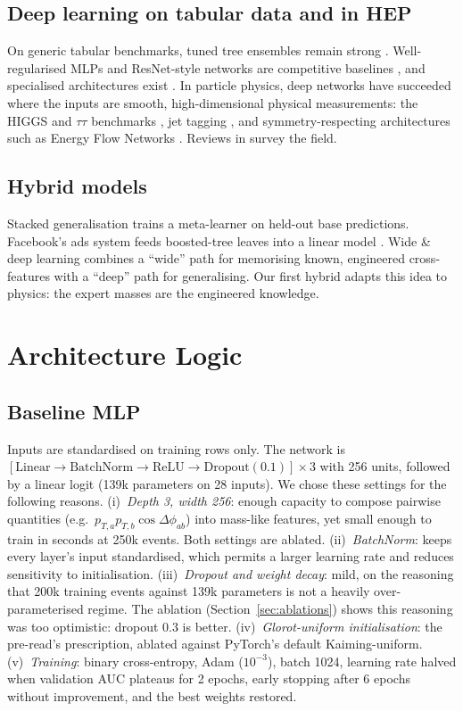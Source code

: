 \documentclass[conference]{IEEEtran}
\begin{document}
\subsection{Deep learning on tabular data and in HEP}
On generic tabular benchmarks, tuned tree ensembles remain strong
\cite{grinsztajn2022tree,shwartzziv2022tabular}. Well-regularised MLPs and ResNet-style networks are
competitive baselines \cite{gorishniy2021revisiting}, and specialised architectures exist
\cite{arik2021tabnet,popov2020neural}. In particle physics, deep networks have succeeded where the
inputs are smooth, high-dimensional physical measurements: the HIGGS and $\tau\tau$ benchmarks
\cite{baldi2014searching,baldi2015tautau}, jet tagging \cite{kasieczka2019toptagging}, and
symmetry-respecting architectures such as Energy Flow Networks \cite{komiske2019energyflow}. Reviews
in \cite{guest2018deep,radovic2018machine} survey the field.

\subsection{Hybrid models}
Stacked generalisation \cite{wolpert1992stacked} trains a meta-learner on held-out base predictions.
Facebook's ads system feeds boosted-tree leaves into a linear model \cite{he2014practical}. Wide \&
deep learning \cite{cheng2016wide} combines a ``wide'' path for memorising known, engineered
cross-features with a ``deep'' path for generalising. Our first hybrid adapts this idea to physics:
the expert masses are the engineered knowledge.

\section{Architecture Logic}\label{sec:arch}
\subsection{Baseline MLP}
Inputs are standardised on training rows only. The network is
$[\text{Linear}\to\text{BatchNorm}\to\text{ReLU}\to\text{Dropout}(0.1)]\times3$ with 256 units,
followed by a linear logit (139k parameters on 28 inputs). We chose these settings for the following
reasons.
(i)~\emph{Depth 3, width 256}: enough capacity to compose pairwise quantities
(e.g.\ $p_{T,a}p_{T,b}\cos\Delta\phi_{ab}$) into mass-like features, yet small enough to train in
seconds at 250k events. Both settings are ablated.
(ii)~\emph{BatchNorm}: keeps every layer's input standardised, which permits a larger learning rate
and reduces sensitivity to initialisation.
(iii)~\emph{Dropout and weight decay}: mild, on the reasoning that 200k training events against 139k
parameters is not a heavily over-parameterised regime. The ablation (Section~\ref{sec:ablations})
shows this reasoning was too optimistic: dropout 0.3 is better.
(iv)~\emph{Glorot-uniform initialisation}: the pre-read's prescription, ablated against PyTorch's
default Kaiming-uniform.
(v)~\emph{Training}: binary cross-entropy, Adam ($10^{-3}$), batch 1024, learning rate halved when
validation AUC plateaus for 2 epochs, early stopping after 6 epochs without improvement, and the best
weights restored.
\end{document}
